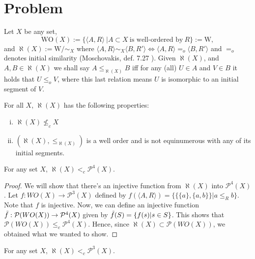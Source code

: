 \section{Problem}
\begin{definition}\label{aleph}
	Let $X$ be any set,
	\[
	\text{WO}(X):=\{\langle A,R\rangle\ |A\subset X \ \text{is well-ordered by}\ R\} := \text{W}, 
	\]
	and $\aleph(X):= \text{W}/{\sim_X}$ where $\langle A,R\rangle \sim_X \langle B, R'\rangle \Longleftrightarrow \langle A, R\rangle =_o \langle B, R'\rangle$ and $=_o$ denotes initial similarity (Moschovakis, def. 7.27 \cite{Moscho}).
	Given $\aleph(X)$, and $A,B \in\aleph(X)$ we shall say $A \leq_{\aleph(X)} B$ iff for any (all) $U\in A$ and $V\in B$ it holds that $U\leq_o V$, where this last relation means $U$ is isomorphic to an initial segment of $V$.
\end{definition}

\begin{lemma}\label{aleph2}
	For all $X$, $\aleph(X)$ has the following properties:
	\begin{enumerate}[(i)]
		\item $\aleph(X)\nleq_c X$
		\item $(\aleph(X),\leq_{\aleph(X)})$ is a well order and is not equinumerous with any of its initial segments.
	\end{enumerate}
\end{lemma}


\begin{theorem}
	For any set $X$, $\aleph(X)<_c \mathcal{P}^4(X)$.
\end{theorem}

\begin{proof}
	We will show that there's an injective function from $\aleph(X)$ into $\mathcal{P}^4(X)$. Let $f:WO(X)\rightarrow \mathcal{P}^3(X)$ defined by $f(\langle A,R\rangle) = \{\{\{a\},\{a,b\}\}| a\leq_R b\}$. Note that $f$ is injective. Now, we can define an injective function $\Tilde{f}: \mathcal{P} (WO(X)) \rightarrow \mathcal{P}^4(X)$ given by $\Tilde{f}(S) = \{f(s) | s\in S\}$. This shows that $\mathcal{P} (WO(X)) \leq_c \mathcal{P}^4(X)$. Hence, since $\aleph (X) \subset \mathcal{P} (WO(X))$, we obtained what we wanted to show.
\end{proof}

\begin{theorem}\label{partes3}
	For any set $X$, $\aleph(X)<_c \mathcal{P}^3(X)$.
\end{theorem}

